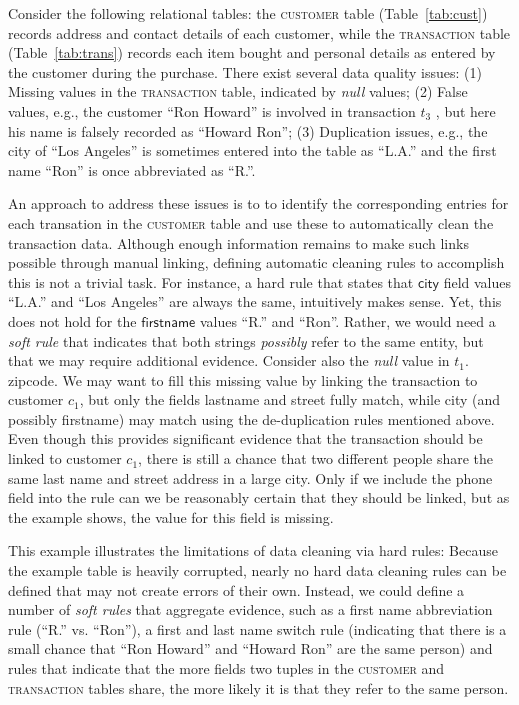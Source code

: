 Consider the following relational tables: the \textsc{customer} table (Table~\ref{tab:cust}) records address and contact details of each customer, while the \textsc{transaction} table (Table~\ref{tab:trans}) records each item bought and personal details as entered by the customer during the purchase. 
There exist several data quality issues: (1) Missing values in the \textsc{transaction} table, indicated by \emph{null} values; (2) False values, e.g.,  the customer ``Ron Howard'' is involved in transaction $t_3$ , but here his name is falsely recorded as ``Howard Ron''; (3) Duplication issues, e.g., the city of ``Los Angeles'' is sometimes entered into the table as ``L.A.'' and the first name ``Ron'' is once abbreviated as ``R.''. 

An approach to address these issues is to to identify the corresponding entries for each transation in the \textsc{customer} table and use these to automatically clean the transaction data. Although enough information remains to make such links possible through manual linking, defining automatic cleaning rules to accomplish this is not a trivial task. For instance, a hard rule that states that $\textsf{city}$ field values ``L.A.'' and ``Los Angeles'' are always the same, intuitively makes sense. Yet, this does not hold for the $\textsf{firstname}$ values ``R.'' and ``Ron''. Rather, we would need a \emph{soft rule} that indicates that both strings \emph{possibly} refer to the same entity, but that we may require additional evidence. Consider also the \emph{null} value in $t_1.$\textsf{zipcode}. We may want to fill this missing value by linking the transaction to customer $c_1$, but only the fields \textsf{lastname} and \textsf{street} fully match, while \textsf{city} (and possibly \textsf{firstname}) may match using the de-duplication rules mentioned above. Even though this provides significant evidence that the transaction should be linked to customer $c_1$, there is still a chance that two different people share the same last name and street address in a large city. Only if we include the \textsf{phone} field into the rule can we be reasonably certain that they should be linked, but as the example shows, the value for this field is missing. 

This example illustrates the limitations of data cleaning via hard rules: Because the example table is heavily corrupted, nearly no hard data cleaning rules can be defined that may not create errors of their own. Instead, we could define a number of \emph{soft rules} that aggregate evidence, such as a first name abbreviation rule (``R.'' vs. ``Ron''), a first and last name switch rule (indicating that there is a small chance that ``Ron Howard'' and ``Howard Ron'' are the same person) and rules that indicate that the more fields two tuples in the \textsc{customer} and \textsc{transaction} tables share, the more likely it is that they refer to the same person. %

